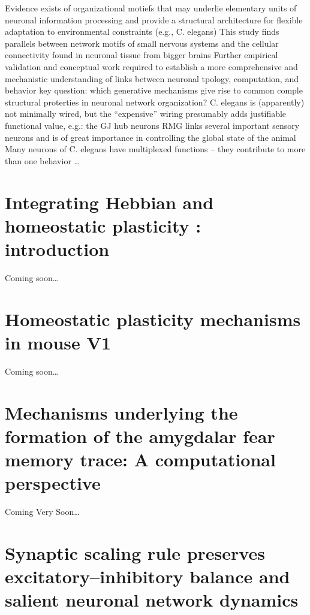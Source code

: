 \documentclass[11pt, a4paper, oneside]{article}   	%
\begin{document}
\begin{outline}
   \point Evidence exists of organizational motiefs that may underlie elementary units of neuronal information processing and provide a structural architecture for flexible adaptation to environmental constraints (e.g., C. elegans)
    \point This study finds parallels between network motifs of small nervous systems and the cellular connectivity found in neuronal tissue from bigger brains
        \subpoint Further empirical validation and conceptual work required to establish a more comprehensive and mechanistic understanding of links between neuronal tpology, computation, and behavior
    \point key question: which generative mechanisms give rise to common comple structural proterties in neuronal network organization?
    \point C. elegans is (apparently) not minimally wired, but the ``expensive'' wiring presumably adds justifiable functional value, e.g.:
        \subpoint the GJ hub neurons RMG links several important sensory neurons and is of great importance in controlling the global state of the animal
    \point Many neurons of C. elegans have multiplexed functions -- they contribute to more than one behavior
    \point  \ldots
\end{outline}

\section{Integrating Hebbian and homeostatic plasticity : introduction \cite{Fox2017}}


Coming soon\ldots

\section{Homeostatic plasticity mechanisms in mouse V1 \cite{Kaneko2017}}

Coming soon\ldots

\section{Mechanisms underlying the formation of the amygdalar fear memory trace: A computational perspective \cite{Feng2016}}

Coming Very Soon\ldots

\section{Synaptic scaling rule preserves excitatory–inhibitory balance and salient neuronal network dynamics \cite{Barral2016}}
\end{document}

